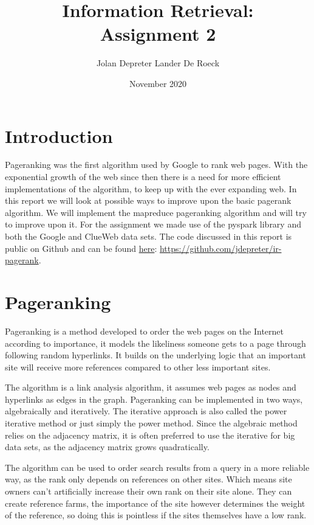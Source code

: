 \documentclass{article}
\title{Information Retrieval:\\ Assignment 2}
\author{Jolan Depreter \cr Lander De Roeck }
\date{November 2020}
\begin{document}
\maketitle



\tableofcontents
\pagebreak

\section{Introduction}
Pageranking was the first algorithm used by Google to rank web pages. With the exponential growth of the web since then there is a need for more efficient implementations of the algorithm, to keep up with the ever expanding web. In this report we will look at possible ways to improve upon the basic pagerank algorithm. We will implement the mapreduce pageranking algorithm and will try to improve upon it. For the assignment we made use of the pyspark library and both the Google and ClueWeb data sets.
The code discussed in this report is public on Github and can be found \href{https://github.com/jdepreter/ir-pagerank}{here}:
\url{https://github.com/jdepreter/ir-pagerank}.

\section{Pageranking}
Pageranking is a method developed to order the web pages on the Internet according to importance, it models the likeliness someone gets to a page through following random hyperlinks. It builds on the underlying logic that an important site will receive more references compared to other less important sites. 

The algorithm is a link analysis algorithm, it assumes web pages as nodes and hyperlinks as edges in the graph. Pageranking can be implemented in two ways, algebraically and iteratively. The iterative approach is also called the power iterative method or just simply the power method. Since the algebraic method relies on the adjacency matrix, it is often preferred to use the iterative for big data sets, as the adjacency matrix grows quadratically.

The algorithm can be used to order search results from a query in a more reliable way, as the rank only depends on references on other sites. Which means site owners can't artificially increase their own rank on their site alone. They can create reference farms, the importance of the site however determines the weight of the reference, so doing this is pointless if the sites themselves have a low rank.
\end{document}
